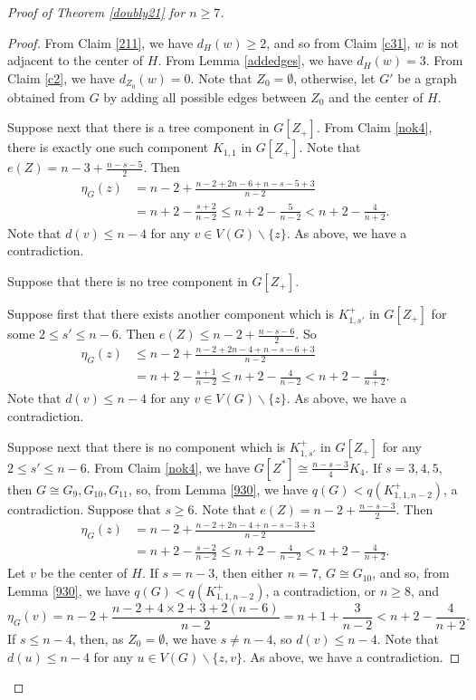 \documentclass[12pt]{article}
\begin{document}
\begin{proof}[Proof of Theorem \ref{doubly21} for $n\ge 7$]
\begin{proof}
From Claim \ref{211}, we have $d_{H}(w)\ge 2$, and so from Claim \ref{c31},  $w$ is not adjacent to the center of $H$.
From Lemma \ref{addedges}, we have $d_{H}(w)=3$.
From Claim \ref{c2}, we have $d_{Z_0}(w)=0$.
Note that $Z_0=\emptyset$, otherwise, let $G'$ be a graph obtained from $G$ by adding all possible edges between $Z_0$ and the center of $H$.


Suppose next that there is a tree component in $G[Z_+]$. From Claim \ref{nok4}, there is exactly one such component $K_{1,1}$ in $G[Z_+]$.
Note that $e(Z)= n-3+\frac{n-s-5}{2}$.
Then
\begin{align*}
\eta_G(z)&= n-2+\frac{n-2+2n-6+n-s-5+3}{n-2}\\
&=n+2-\frac{s+2}{n-2}\le n+2-\frac{5}{n-2}<n+2-\frac{4}{n+2}.
\end{align*}
Note that $d(v)\le n-4$ for any $v\in V(G)\backslash\{z\}$.
As above, we have a contradiction.


Suppose  that there is no tree component in $G[Z_+]$.


Suppose first that there exists another component which is $K_{1,s'}^+$ in $G[Z_+]$ for some $2\le s'\le n-6$.  Then  $e(Z)\le n-2+\frac{n-s-6}{2}$.
So
\begin{align*}
\eta_G(z)&\le n-2+\frac{n-2+2n-4+n-s-6+3}{n-2}\\
&=n+2-\frac{s+1}{n-2}\le n+2-\frac{4}{n-2}<n+2-\frac{4}{n+2}.
\end{align*}
Note that $d(v)\le n-4$ for any $v\in V(G)\backslash\{z\}$. As above, we have a contradiction.


Suppose next  that there is no component which is $K_{1,s'}^+$ in $G[Z_+]$ for any $2\le s'\le n-6$. From Claim \ref{nok4}, we have $G[Z^*]\cong \frac{n-s-3}{4}K_4$.
If $s=3,4,5$, then $G\cong G_{9}, G_{10}, G_{11}$, so, from Lemma \ref{930}, we have $q(G)<q(K_{1,1,n-2}^+)$, a contradiction.
Suppose that $s\ge 6$. Note that $e(Z)=n-2+\frac{n-s-3}{2}$.
Then
\begin{align*}
\eta_G(z)&=n-2+\frac{n-2+2n-4+n-s-3+3}{n-2}\\
&=n+2-\frac{s-2}{n-2}\le n+2-\frac{4}{n-2}<n+2-\frac{4}{n+2}.
\end{align*}
Let $v$ be the center of $H$.  If  $s=n-3$, then either
$n=7$,  $G\cong G_{10}$, and so, from Lemma \ref{930}, we have $q(G)<q(K_{1,1,n-2}^+)$, a contradiction, or $n\ge 8$, and
\[
\eta_G(v)=n-2+\frac{n-2+4\times2+3+2(n-6)}{n-2}=n+1+\frac{3}{n-2}<n+2-\frac{4}{n+2}.
\]
If $s\le n-4$,  then, as $Z_0=\emptyset$, we have $s\neq n-4$, so  $d(v)\le n-4$.
Note that $d(u)\le n-4$ for any $u\in V(G)\backslash\{z,v\}$.
As above, we have a contradiction.
\end{proof}


\end{proof}
\end{document}
